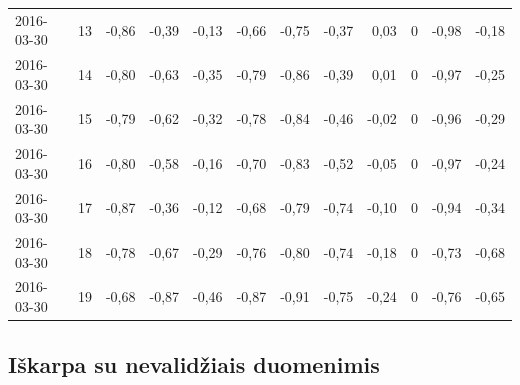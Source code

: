 \documentclass[]{VUMIFTemplateClass}
\begin{document}
\begin{table}[H]
{\begin{tabular}{|l|c|r|r|r|r|r|r|r|c|r|r|}
                2016-03-30    & 13            & -0,86            & -0,39            & -0,13             & -0,66                 & -0,75                  & -0,37             & 0,03           & 0                    & -0,98                & -0,18                \\
                2016-03-30    & 14            & -0,80            & -0,63            & -0,35             & -0,79                 & -0,86                  & -0,39             & 0,01           & 0                    & -0,97                & -0,25                \\
                2016-03-30    & 15            & -0,79            & -0,62            & -0,32             & -0,78                 & -0,84                  & -0,46             & -0,02          & 0                    & -0,96                & -0,29                \\
                2016-03-30    & 16            & -0,80            & -0,58            & -0,16             & -0,70                 & -0,83                  & -0,52             & -0,05          & 0                    & -0,97                & -0,24                \\
                2016-03-30    & 17            & -0,87            & -0,36            & -0,12             & -0,68                 & -0,79                  & -0,74             & -0,10          & 0                    & -0,94                & -0,34                \\
                2016-03-30    & 18            & -0,78            & -0,67            & -0,29             & -0,76                 & -0,80                  & -0,74             & -0,18          & 0                    & -0,73                & -0,68                \\
                2016-03-30    & 19            & -0,68            & -0,87            & -0,46             & -0,87                 & -0,91                  & -0,75             & -0,24          & 0                    & -0,76                & -0,65                \\
                \hline
            \end{tabular}        }
        \label{tab:normalized_sample}
    \end{table}

    \subsection{Iškarpa su nevalidžiais duomenimis}
\end{document}
